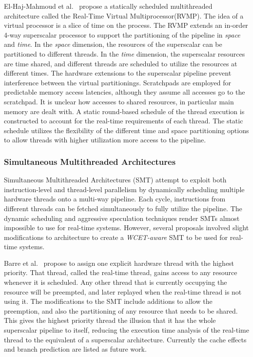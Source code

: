 El-Haj-Mahmoud et al.~\cite{El-Haj-Mahmoud2005VirtualMultiprocessor} propose a statically scheduled multithreaded architecture called the Real-Time Virtual Multiprocessor(RVMP).   
The idea of a virtual processor is a slice of time on the process. 
The RVMP extends an in-order 4-way superscalar processor to support the partitioning of the pipeline in \emph{space} and \emph{time}.  
In the \emph{space} dimension, the resources of the superscalar can be partitioned to different threads. 
In the \emph{time} dimension, the superscalar resources are time shared, and different threads are scheduled to utilize the resources at different times.  
The hardware extensions to the superscalar pipeline prevent interference between the virtual partitionings.
Scratchpads are employed for predictable memory access latencies, although they assume all accesses go to the scratchpad. 
It is unclear how accesses to shared resources, in particular main memory are dealt with.
A static round-based schedule of the thread execution is constructed to account for the real-time requirements of each thread.
The static schedule utilizes the flexibility of the different time and space partitioning options to allow threads with higher utilization more access to the pipeline. 

\subsubsection{Simultaneous Multithreaded Architectures} 
\label{sec:RTSMT}
Simultaneous Multithreaded Architectures (SMT) attempt to exploit both instruction-level and thread-level parallelism by dynamically scheduling multiple hardware threads onto a multi-way pipeline. 
Each cycle, instructions from different threads can be fetched simultaneously to fully utilize the pipeline.
The dynamic scheduling and aggressive speculation techniques render SMTs almost impossible to use for real-time systems.  
However, several proposals involved slight modifications to architecture to create a \emph{WCET-aware} SMT to be used for real-time systems.  

Barre et al.~\cite{Barre2008RTSMT} propose to assign one explicit hardware thread with the highest priority. 
That thread, called the real-time thread, gains access to any resource whenever it is scheduled. 
Any other thread that is currently occupying the resource will be preempted, and later replayed when the real-time thread is not using it.
The modifications to the SMT include additions to allow the preemption, and also the partitioning of any resource that needs to be shared. 
This gives the highest priority thread the illusion that it has the whole superscalar pipeline to itself, reducing the execution time analysis of the real-time thread to the equivalent of a superscalar architecture. 
Currently the cache effects and branch prediction are listed as future work.  

